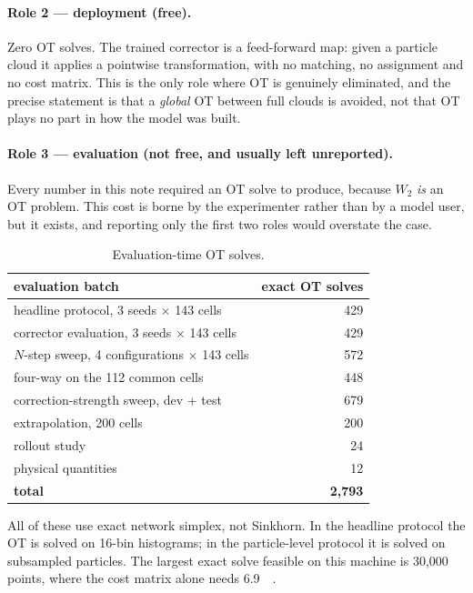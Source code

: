 ﻿\documentclass[11pt,a4paper]{article}
\newcommand{\Wtwo}{W_2}
\begin{document}
\paragraph{Role 2 --- deployment (free).} Zero OT solves. The trained corrector is a
feed-forward map: given a particle cloud it applies a pointwise transformation, with no matching,
no assignment and no cost matrix. This is the only role where OT is genuinely eliminated, and the
precise statement is that a \emph{global} OT between full clouds is avoided, not that OT plays no
part in how the model was built.

\paragraph{Role 3 --- evaluation (not free, and usually left unreported).} Every number in this
note required an OT solve to produce, because $\Wtwo$ \emph{is} an OT problem. This cost is borne
by the experimenter rather than by a model user, but it exists, and reporting only the first two
roles would overstate the case.

\begin{table}[h]
\centering
\small
\begin{tabular}{@{}lr@{}}
\toprule
evaluation batch & exact OT solves \\
\midrule
headline protocol, 3 seeds $\times$ 143 cells & 429 \\
corrector evaluation, 3 seeds $\times$ 143 cells & 429 \\
$N$-step sweep, 4 configurations $\times$ 143 cells & 572 \\
four-way on the 112 common cells & 448 \\
correction-strength sweep, dev + test & 679 \\
extrapolation, 200 cells & 200 \\
rollout study & 24 \\
physical quantities & 12 \\
\midrule
\textbf{total} & \textbf{2{,}793} \\
\bottomrule
\end{tabular}
\caption{Evaluation-time OT solves.}
\end{table}

All of these use exact network simplex, not Sinkhorn. In the headline protocol the OT is solved
on 16-bin histograms; in the particle-level protocol it is solved on subsampled particles. The
largest exact solve feasible on this machine is 30{,}000 points, where the cost matrix alone
needs \SI{6.9}{\giga\byte}.
\end{document}
